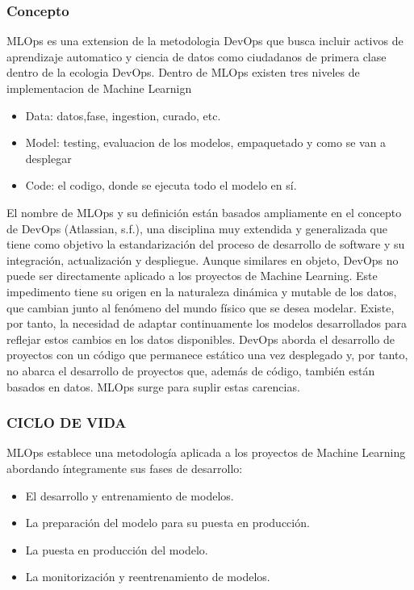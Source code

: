 \documentclass[twoside,twocolumn]{article}
\begin{document}
\subsubsection{Concepto}
MLOps es una extension de la metodologia DevOps que busca incluir activos 
de aprendizaje automatico y ciencia de datos como ciudadanos de primera clase dentro de la 
ecologia DevOps. Dentro de MLOps existen tres niveles de implementacion de 
Machine Learnign
\begin{itemize}
    \item Data: datos,fase, ingestion, curado, etc.
    \item Model: testing, evaluacion de los modelos, empaquetado y como se van a desplegar
    \item Code: el codigo, donde se ejecuta todo el modelo en sí.
\end{itemize}
El nombre de MLOps y su definición están basados ampliamente en el concepto de DevOps (Atlassian, s.f.), una disciplina muy extendida y generalizada que tiene como objetivo la estandarización del proceso de desarrollo de software y su integración, actualización y despliegue. Aunque similares en objeto, DevOps no puede ser directamente aplicado a los proyectos de Machine Learning. Este impedimento tiene su origen en la naturaleza dinámica y mutable de los datos, que cambian junto al fenómeno del mundo físico que se desea modelar. Existe, por tanto, la necesidad de adaptar continuamente los modelos desarrollados para reflejar estos cambios en los datos disponibles. DevOps aborda el desarrollo de proyectos con un código que permanece estático una vez desplegado y, por tanto, no abarca el desarrollo de proyectos que, además de código, también están basados en datos. MLOps surge para suplir estas carencias.
\subsubsection{CICLO DE VIDA}
MLOps establece una metodología aplicada a los proyectos de Machine Learning abordando íntegramente sus fases de desarrollo:

\begin{itemize}
    \item  El desarrollo y entrenamiento de modelos.
    \item  La preparación del modelo para su puesta en producción.
    \item  La puesta en producción del modelo.
    \item  La monitorización y reentrenamiento de modelos.
\end{itemize}
\end{document}
